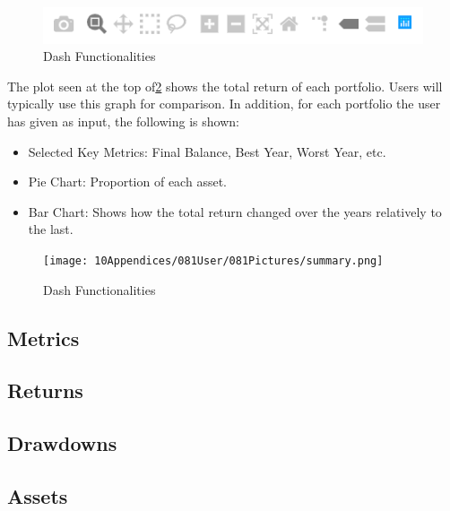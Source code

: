 \documentclass[main.tex]{subfiles}
\begin{document}
\begin{figure}[H]
   \centering
   \includegraphics[width=\textwidth]{10Appendices/081User/081Pictures/dash_funcionalities.png}
   \caption{Dash Functionalities}
   \label{dash_functionalities}
\end{figure}

The plot seen at the top of\figurename{\ref{summary}} shows the total return of each portfolio. Users will typically use this graph for comparison. In addition, for each portfolio the user has given as input, the following is shown:
\begin{itemize}
    \item Selected Key Metrics: Final Balance, Best Year, Worst Year, etc.
    \item Pie Chart: Proportion of each asset.
    \item Bar Chart: Shows how the total return changed over the years relatively to the last.
\end{itemize}

\begin{figure}[H]
   \centering
   \texttt{[image: 10Appendices/081User/081Pictures/summary.png]}
   \caption{Dash Functionalities}
   \label{summary}
\end{figure}


\subsection*{Metrics}
\subsection*{Returns}
\subsection*{Drawdowns}
\subsection*{Assets}
\end{document}
